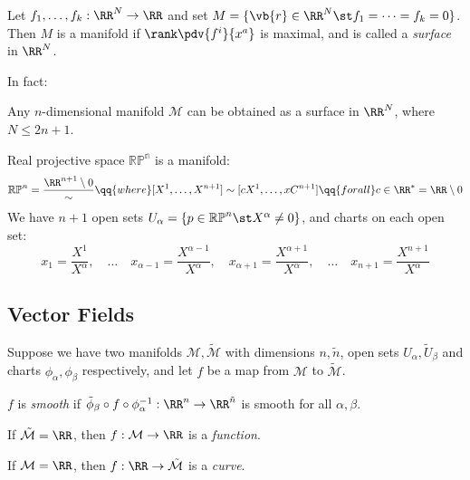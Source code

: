 \documentclass{jknotes}
\begin{document}
\begin{eg}
    Let \(f_1,\dots,f_k:\RR^N\rightarrow\RR\) and set \(M = \{\vb{r}\in\RR^N\st f_1 = \dots = f_k = 0\}\). Then \(M\) is a manifold if \(\rank\pdv{f^i}{x^a}\) is maximal, and is called a \emph{surface} in \(\RR^N\).
\end{eg}
In fact:
\begin{theorem}[Whitney]
    Any \(n\)-dimensional manifold \(\mathcal{M}\) can be obtained as a surface in \(\RR^N\), where \(N \le 2n+1\).
\end{theorem}
\begin{eg}
    Real projective space \(\mathbb{RP^n}\) is a manifold:
    \begin{equation}
        \mathbb{RP}^n = \frac{\RR^{n+1}\setminus{0}}{\sim} \qq{where} [X^1,\dots,X^{n+1}] \sim [cX^1,\dots,xC^{n+1}] \qq{for all} c \in \RR^* = \RR \setminus {0}
    \end{equation}
    We have \(n+1\) open sets \(U_\alpha = \{p\in\mathbb{RP}^n\st X^\alpha \ne 0\}\), and charts on each open set:
    \begin{equation}
        x_1 = \frac{X^1}{X^\alpha},\quad\dots\quad x_{\alpha-1} = \frac{X^{\alpha-1}}{X^\alpha},\quad x_{\alpha+1} = \frac{X^{\alpha+1}}{X^\alpha},\quad \dots\quad x_{n+1} = \frac{X^{n+1}}{X^\alpha}
    \end{equation}
\end{eg}

\subsection{Vector Fields}

Suppose we have two manifolds \(\mathcal{M},\tilde{\mathcal{M}}\) with dimensions \(n,\tilde{n}\), open sets \(U_\alpha,\tilde{U}_\beta\) and charts \(\phi_\alpha,\phi_\beta\) respectively, and let \(f\) be a map from \(\mathcal{M}\) to \(\tilde{\mathcal{M}}\).

\begin{defn}
    \(f\) is \emph{smooth} if \(\tilde{\phi}_\beta\circ f\circ\phi_\alpha^{-1}:\RR^n\rightarrow\RR^{\tilde{n}}\) is smooth for all \(\alpha, \beta\).
\end{defn}

\begin{defn}
    If \(\tilde{\mathcal{M}}=\RR\), then \(f:\mathcal{M}\rightarrow\RR\) is a \emph{function}.
\end{defn}

\begin{defn}
    If \(\mathcal{M} = \RR\), then \(f:\RR\rightarrow\tilde{\mathcal{M}}\) is a \emph{curve}.
\end{defn}
\end{document}
